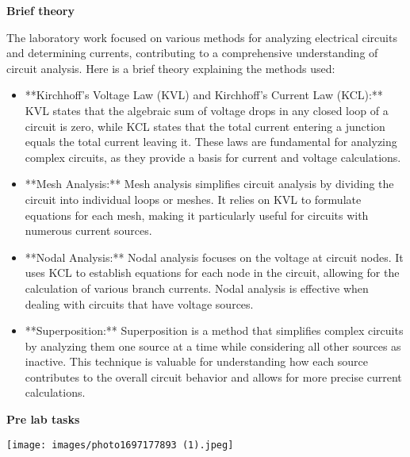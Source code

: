\documentclass{article}
\begin{document}
\begin{flushleft}
\textbf{Brief theory}
\end{flushleft}

\begin{flushleft}
The laboratory work focused on various methods for analyzing electrical circuits and determining currents, contributing to a comprehensive understanding of circuit analysis. Here is a brief theory explaining the methods used:

\begin{itemize}
    \item **Kirchhoff's Voltage Law (KVL) and Kirchhoff's Current Law (KCL):** KVL states that the algebraic sum of voltage drops in any closed loop of a circuit is zero, while KCL states that the total current entering a junction equals the total current leaving it. These laws are fundamental for analyzing complex circuits, as they provide a basis for current and voltage calculations.

    \item **Mesh Analysis:** Mesh analysis simplifies circuit analysis by dividing the circuit into individual loops or meshes. It relies on KVL to formulate equations for each mesh, making it particularly useful for circuits with numerous current sources.

    \item **Nodal Analysis:** Nodal analysis focuses on the voltage at circuit nodes. It uses KCL to establish equations for each node in the circuit, allowing for the calculation of various branch currents. Nodal analysis is effective when dealing with circuits that have voltage sources.

    \item **Superposition:** Superposition is a method that simplifies complex circuits by analyzing them one source at a time while considering all other sources as inactive. This technique is valuable for understanding how each source contributes to the overall circuit behavior and allows for more precise current calculations.
\end{itemize}
\end{flushleft}
\newpage
\begin{flushleft}
\textbf{Pre lab tasks}
\end{flushleft}

\begin{flushleft}
    \centering
    \texttt{[image: images/photo1697177893 (1).jpeg]}
\end{flushleft}
\end{document}
